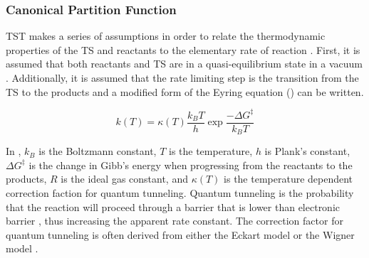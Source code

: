 \documentclass[preprint, 11pt]{elsarticle} %
\begin{document}
\subsubsection{Canonical Partition Function}

TST makes a series of assumptions in order to relate the thermodynamic properties of the TS and reactants to the elementary rate of reaction \cite{eyring:1935}. 
First, it is assumed that both reactants and TS are in a quasi-equilibrium state in a vacuum \cite{QSS:2017}.
Additionally, it is assumed that the rate limiting step is the transition from the TS to the products and a modified form of the Eyring equation () can be written.

\begin{equation}
    k(T) = \kappa(T) \frac{k_B T}{h} \exp{\frac{-\Delta G^\ddagger}{k_B T}}
    \label{eyring:1}
\end{equation}

In , $k_B$ is the Boltzmann constant, $T$ is the temperature, $h$ is Plank's constant, $\Delta G^\ddagger$ is the change in Gibb's energy when progressing from the reactants to the products, $R$ is the ideal gas constant, 
and $\kappa(T)$ is the temperature dependent correction faction for quantum tunneling.
Quantum tunneling is the probability that the reaction will proceed through a barrier that is lower than electronic barrier \cite{RUBAKOV:1984}, thus increasing the apparent rate constant.
The correction factor for quantum tunneling is often derived from either the Eckart model \cite{eckart:1930} or the Wigner model \cite{Winger:1932}.
\end{document}
